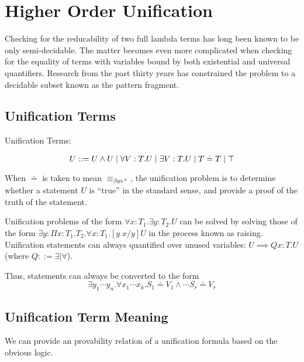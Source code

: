 \section{Higher Order Unification}

Checking for the reducability of two full lambda terms has long been known to be only semi-decidable.
The matter becomes even more complicated when checking for the equality of terms with variables bound
by both existential and universal quantifiers.  Research from the past thirty years has constrained
the problem to a decidable subset known as the pattern fragment.

\subsection{Unification Terms}

\begin{definition}
Unification Terms:

\[
U ::= U \wedge U 
 \; | \; \forall V : T . U
 \; | \; \exists V : T . U 
 \; | \; T \doteq T
 \; | \; \top
\]
\label{def:hou:syn}
\end{definition}

When $\doteq$ is taken to mean $\equiv_{\beta\eta\alpha*}$, the unification problem is to determine 
whether a statement $U$ is ``true'' in the standard sense, and provide a proof of the truth of the statement. 

Unification problems of the form 
$\forall x : T_1 . \exists y : T_2 . U $ can be solved by solving those of the form
$\exists y : \Pi x : T_1 . T_2 . \forall x : T_1 . [y\; x / y ]U $ 
in the process known as raising. 
Unification statements can always quantified over unused variables: $U \implies Q x : T . U$ (where $Q ::= \exists | \forall $).  

Thus, statements can always be converted to the form
\[
\exists y_1 \cdots y_n . \forall x_1 \cdots x_k . S_1 \doteq V_1 \wedge \cdots S_r \doteq V_r
\]




\subsection{Unification Term Meaning}

We can provide an provability relation of a unification formula
based on the obvious logic.

